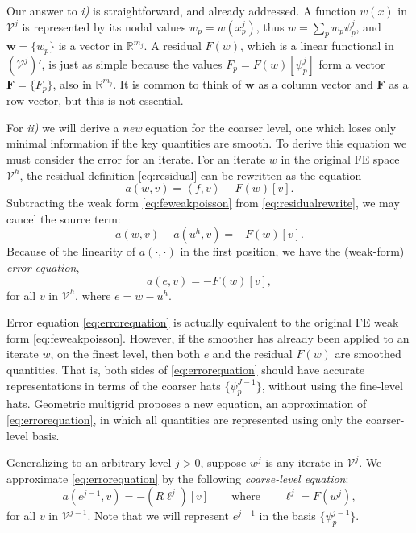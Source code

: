 \documentclass[letterpaper,final,12pt,reqno]{amsart}
\theoremstyle{claim}
\newcommand{\RR}{\mathbb{R}}
\newcommand{\bw}{\mathbf{w}}
\newcommand{\bF}{\mathbf{F}}
\newcommand{\ip}[2]{\left<#1,#2\right>}
\numberwithin{equation}{section}
\numberwithin{figure}{section}
\numberwithin{table}{section}
\begin{document}
Our answer to \emph{i)} is straightforward, and already addressed.  A function $w(x)$ in $\mathcal{V}^j$ is represented by its nodal values $w_p=w(x_p^j)$, thus $w = \sum_p w_p \psi_p^j$, and $\bw = \{w_p\}$ is a vector in $\RR^{m_j}$.  A residual $F(w)$, which is a linear functional in $(\mathcal{V}^j)'$, is just as simple because the values $F_p = F(w)[\psi_p^j]$ form a vector $\bF=\{F_p\}$, also in $\RR^{m_j}$.  It is common to think of $\bw$ as a column vector and $\bF$ as a row vector, but this is not essential.

For \emph{ii)} we will derive a \emph{new} equation for the coarser level, one which loses only minimal information if the key quantities are smooth.  To derive this equation we must consider the error for an iterate.  For an iterate $w$ in the original FE space $\mathcal{V}^h$, the residual definition \eqref{eq:residual} can be rewritten as the equation
\begin{equation}
  a(w,v) = \ip{f}{v} - F(w)[v].  \label{eq:residualrewrite}
\end{equation}
Subtracting the weak form \eqref{eq:feweakpoisson} from \eqref{eq:residualrewrite}, we may cancel the source term:
\begin{equation}
  a(w,v) - a(u^h,v) = - F(w)[v].  \label{eq:errorequationearly}
\end{equation}
Because of the linearity of $a(\cdot,\cdot)$ in the first position, we have the (weak-form) \emph{error equation},
\begin{equation}
  a(e,v) = - F(w)[v],  \label{eq:errorequation}
\end{equation}
for all $v$ in $\mathcal{V}^h$, where $e=w-u^h$.

Error equation \eqref{eq:errorequation} is actually equivalent to the original FE weak form \eqref{eq:feweakpoisson}.  However, if the smoother has already been applied to an iterate $w$, on the finest level, then both $e$ and the residual $F(w)$ are smoothed quantities.  That is, both sides of \eqref{eq:errorequation} should have accurate representations in terms of the coarser hats $\{\psi_p^{J-1}\}$, without using the fine-level hats.  Geometric multigrid proposes a new equation, an approximation of \eqref{eq:errorequation}, in which all quantities are represented using only the coarser-level basis.

Generalizing to an arbitrary level $j>0$, suppose $w^j$ is any iterate in $\mathcal{V}^j$.  We approximate \eqref{eq:errorequation} by the following \emph{coarse-level equation}:
\begin{equation}
  a(e^{j-1},v) = - (R\ell^j)[v] \qquad \text{where} \qquad \ell^j = F(w^j),  \label{eq:coarsecorrection}
\end{equation}
for all $v$ in $\mathcal{V}^{j-1}$.  Note that we will represent $e^{j-1}$ in the basis $\{\psi_p^{j-1}\}$.
\end{document}
